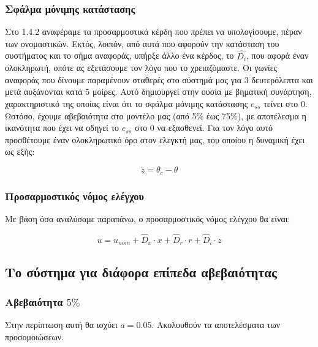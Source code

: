 \documentclass{article}
\begin{document}
    \subsubsection{Σφάλμα μόνιμης κατάστασης}
    Στο 1.4.2 αναφέραμε τα προσαρμοστικά κέρδη που πρέπει να υπολογίσουμε, πέραν των ονομαστικών. Εκτός, λοιπόν, από αυτά που αφορούν την κατάσταση του συστήματος και το σήμα αναφοράς, υπήρξε άλλο ένα κέρδος, το \(\hat{D_i}\), που αφορά έναν ολοκληρωτή, οπότε ας εξετάσουμε τον λόγο που το χρειαζόμαστε. Οι γωνίες αναφοράς που δίνουμε παραμένουν σταθερές στο σύστημά μας για 3 δευτερόλεπτα και μετά αυξάνονται κατά 5 μοίρες. Αυτό δημιουργεί στην ουσία με βηματική συνάρτηση, χαρακτηριστικό της οποίας είναι ότι το σφάλμα μόνιμης κατάστασης \(e_{ss}\) τείνει στο 0. Ωστόσο, έχουμε αβεβαιότητα στο μοντέλο μας (από 5\% έως 75\%), με αποτέλεσμα η ικανότητα που έχει να οδηγεί το \(e_{ss}\) στο 0 να εξασθενεί. Για τον λόγο αυτό προσθέτουμε έναν ολοκληρωτικό όρο στον ελεγκτή μας, του οποίου η δυναμική έχει ως εξής:
    
    \begin{equation*}
        \dot{z} = \theta_c - \theta
    \end{equation*}
    
    \subsubsection{Προσαρμοστικός νόμος ελέγχου}
    Με βάση όσα αναλύσαμε παραπάνω, ο προσαρμοστικός νόμος ελέγχου θα είναι:
    
    \begin{equation}
        u = u_{nom} + \hat{D}_x \cdot x + \hat{D}_r \cdot r + \hat{D}_i \cdot z
    \end{equation}
    
    \subsection{Το σύστημα για διάφορα επίπεδα αβεβαιότητας}
    \subsubsection{Αβεβαιότητα \(5\%\)}
    Στην περίπτωση αυτή θα ισχύει \(a = 0.05\). Ακολουθούν τα αποτελέσματα των προσομοιώσεων.
    
\end{document}
